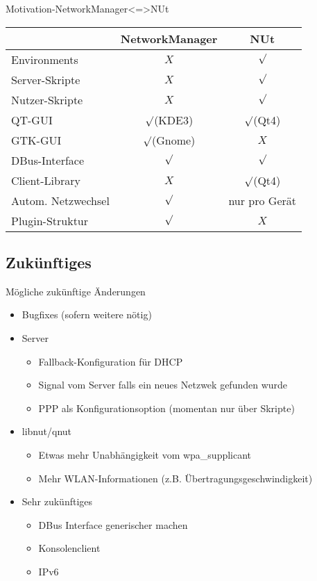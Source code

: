 \begin{frame}[<+-| alert@+>]{Motivation-NetworkManager<=>NUt}
	\begin{tabular}{l|c|c}
								& NetworkManager	& NUt \\
		\hline
		Environments			& $X$					& $\surd$ \\
		\hline
		Server-Skripte			& $X$					& $\surd$ \\
		\hline
		Nutzer-Skripte			& $X$					& $\surd$ \\
		\hline
		QT-GUI					& $\surd$(KDE3)			& $\surd$(Qt4) \\
		\hline
		GTK-GUI					& $\surd$(Gnome)		& $X$			\\
		\hline
		DBus-Interface			& $\surd$				& $\surd$	\\
		\hline
		Client-Library			& $X$					& $\surd$(Qt4)	\\
		\hline
		Autom. Netzwechsel		& $\surd$				& nur pro Gerät \\
		\hline
		Plugin-Struktur			& $\surd$				& $X$
	\end{tabular}
\end{frame}


\subsection{Zukünftiges}
\begin{frame}[<+-|alert@+>]{Mögliche zukünftige Änderungen}
	\begin{itemize}
		\item Bugfixes (sofern weitere nötig)
		\item Server
		\begin{itemize}
			\item Fallback-Konfiguration für DHCP
			\item Signal vom Server falls ein neues Netzwek gefunden wurde
			\item PPP als Konfigurationsoption (momentan nur über Skripte)
		\end{itemize}
		\item libnut/qnut
		\begin{itemize}
			\item Etwas mehr Unabhängigkeit vom wpa\_supplicant
			\item Mehr WLAN-Informationen (z.B. Übertragungsgeschwindigkeit)
		\end{itemize}
		\item Sehr zukünftiges
		\begin{itemize}
			\item DBus Interface generischer machen
			\item Konsolenclient
			\item IPv6
		\end{itemize}
	\end{itemize}
\end{frame}

